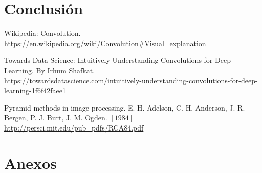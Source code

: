 \documentclass[12pt, letterpaper]{article}
\begin{document}
\section{Conclusión}


\newpage
\begin{thebibliography}{X}
     Wikipedia: Convolution. \\
    \url{https://en.wikipedia.org/wiki/Convolution#Visual_explanation} 

     Towards Data Science: Intuitively Understanding Convolutions for Deep Learning. By Irhum Shafkat. \\
    \url{https://towardsdatascience.com/intuitively-understanding-convolutions-for-deep-learning-1f6f42faee1} 

     Pyramid methods in image processing. E. H. Adelson, C. H. Anderson,  J. R. Bergen,  P. J. Burt,  J. M. Ogden. $[1984]$
    \url{http://persci.mit.edu/pub_pdfs/RCA84.pdf}

\end{thebibliography}

\section{Anexos}
\end{document}
